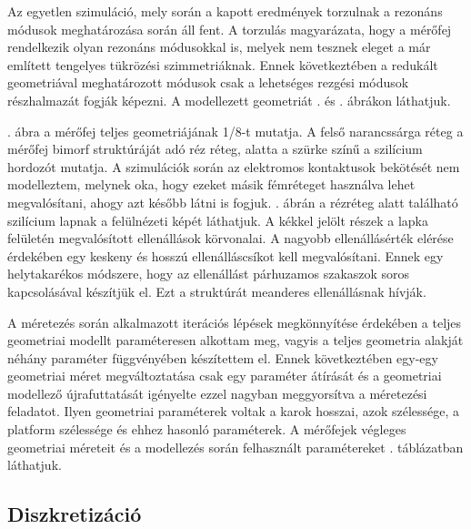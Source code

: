 
Az egyetlen szimuláció, mely során a kapott eredmények torzulnak a rezonáns módusok meghatározása során áll fent. A torzulás magyarázata, hogy a mérőfej rendelkezik olyan rezonáns módusokkal is, melyek nem tesznek eleget a már említett tengelyes tükrözési szimmetriáknak. Ennek következtében a redukált geometriával meghatározott módusok csak a lehetséges rezgési módusok részhalmazát fogják képezni. A modellezett geometriát . és . ábrákon láthatjuk.


. ábra a mérőfej teljes geometriájának 1/8-t mutatja. A felső narancssárga réteg a mérőfej bimorf struktúráját adó réz réteg, alatta a szürke színű a szilícium hordozót mutatja. A szimulációk során az elektromos kontaktusok bekötését nem modelleztem, melynek oka, hogy ezeket másik fémréteget használva lehet megvalósítani, ahogy azt később látni is fogjuk. . ábrán a rézréteg alatt található szilícium lapnak a felülnézeti képét láthatjuk. A kékkel jelölt részek a lapka felületén megvalósított ellenállások körvonalai. A nagyobb ellenállásérték elérése érdekében egy keskeny és hosszú ellenálláscsíkot kell megvalósítani. Ennek egy helytakarékos módszere, hogy az ellenállást párhuzamos szakaszok soros kapcsolásával készítjük el. Ezt a struktúrát meanderes ellenállásnak hívják.

A méretezés során alkalmazott iterációs lépések megkönnyítése érdekében a teljes geometriai modellt paraméteresen alkottam meg, vagyis a teljes geometria alakját néhány paraméter függvényében készítettem el. Ennek következtében egy-egy geometriai méret megváltoztatása csak egy paraméter átírását és a geometriai modellező újrafuttatását igényelte ezzel nagyban meggyorsítva a méretezési feladatot. Ilyen geometriai paraméterek voltak a karok hosszai, azok szélessége, a platform szélessége és ehhez hasonló paraméterek. A mérőfejek végleges geometriai méreteit és a modellezés során felhasznált paramétereket . táblázatban láthatjuk.

\subsection{Diszkretizáció}

